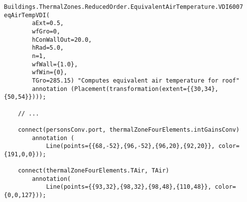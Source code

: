 \bigskip

\begin{lstlisting}[language=Modelica, backgroundcolor=\color{aliceblue}, caption={Updated Modelica code after Modelica Builder}, captionpos=b, label={code_gmt_modelica}]
	Buildings.ThermalZones.ReducedOrder.EquivalentAirTemperature.VDI6007 eqAirTempVDI(
		aExt=0.5,
		wfGro=0,
		hConWallOut=20.0,
		hRad=5.0,
		n=1,
		wfWall={1.0},
		wfWin={0},
		TGro=285.15) "Computes equivalent air temperature for roof"
		annotation (Placement(transformation(extent={{30,34},{50,54}})));
	
	// ... 
	
	connect(personsConv.port, thermalZoneFourElements.intGainsConv)
		annotation (
			Line(points={{68,-52},{96,-52},{96,20},{92,20}}, color={191,0,0}));
	
	connect(thermalZoneFourElements.TAir, TAir) 
		annotation(
			Line(points={{93,32},{98,32},{98,48},{110,48}}, color={0,0,127}));		
\end{lstlisting}



